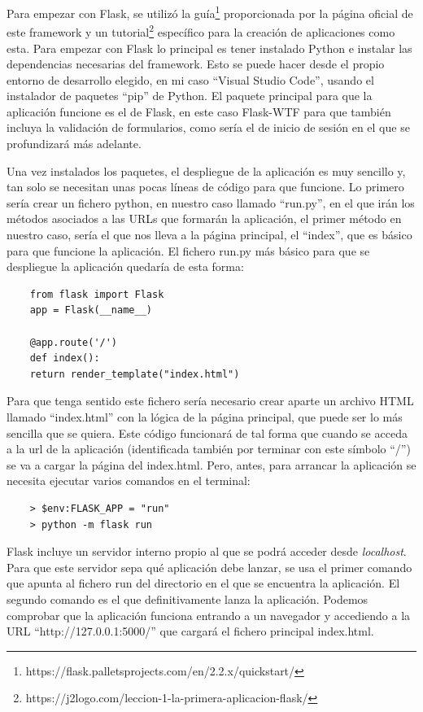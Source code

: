 Para empezar con Flask, se utilizó la guía\footnote{https://flask.palletsprojects.com/en/2.2.x/quickstart/} proporcionada por la página oficial de este framework y un tutorial\footnote{https://j2logo.com/leccion-1-la-primera-aplicacion-flask/} específico para la creación de aplicaciones como esta. Para empezar con Flask lo principal es tener instalado Python e instalar las dependencias necesarias del framework. Esto se puede hacer desde el propio entorno de desarrollo elegido, en mi caso ``Visual Studio Code'', usando el instalador de paquetes ``pip'' de Python. El paquete principal para que la aplicación funcione es el de Flask, en este caso Flask-WTF para que también incluya la validación de formularios, como sería el de inicio de sesión en el que se profundizará más adelante.  

Una vez instalados los paquetes, el despliegue de la aplicación es muy sencillo y, tan solo se necesitan unas pocas líneas de código para que funcione. Lo primero sería crear un fichero python, en nuestro caso llamado ``run.py'', en el que irán los métodos asociados a las URLs que formarán la aplicación, el primer método en nuestro caso, sería el que nos lleva a la página principal, el ``index'', que es básico para que funcione la aplicación. El fichero run.py más básico para que se despliegue la aplicación quedaría de esta forma:

\begin{verbatim}
	from flask import Flask
	app = Flask(__name__)
	
	@app.route('/')
	def index():
	return render_template("index.html")
\end{verbatim}

Para que tenga sentido este fichero sería necesario crear aparte un archivo HTML llamado ``index.html'' con la lógica de la página principal, que puede ser lo más sencilla que se quiera. Este código funcionará de tal forma que cuando se acceda a la url de la aplicación (identificada también por terminar con este símbolo ``/'') se va a cargar la página del index.html. Pero, antes, para arrancar la aplicación se necesita ejecutar varios comandos en el terminal:

\begin{verbatim}
	> $env:FLASK_APP = "run"
	> python -m flask run
\end{verbatim}

Flask incluye un servidor interno propio al que se podrá acceder desde \textit{localhost}. Para que este servidor sepa qué aplicación debe lanzar, se usa el primer comando que apunta al fichero run del directorio en el que se encuentra la aplicación. El segundo comando es el que definitivamente lanza la aplicación. Podemos comprobar que la aplicación funciona entrando a un navegador y accediendo a la URL ``http://127.0.0.1:5000/'' que cargará el fichero principal index.html. 

